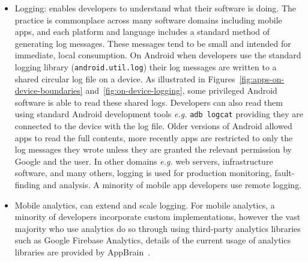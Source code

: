 \begin{itemize}
    \item Logging: enables developers to understand what their software is doing. The practice is commonplace across many software domains including mobile apps, and each platform and language includes a standard method of generating log messages. These messages tend to be small and intended for immediate, local consumption. On Android when developers use the standard logging library (\texttt{android.util.log}) their log messages are written to a shared circular log file on a device. As illustrated in Figures~\ref{fig:apps-on-device-boundaries} and~\ref{fig:on-device-logging}, some privileged Android software is able to read these shared logs. Developers can also read them using standard Android development tools \emph{e.g.} \texttt{adb logcat} providing they are connected to the device with the log file. Older versions of Android allowed apps to read the full contents, more recently apps are restricted to only the log messages they wrote unless they are granted the relevant permission by Google and the user. 
    In other domains \emph{e.g.} web servers, infrastructure software, and many others, logging is used for production monitoring, fault-finding and analysis. A minority of mobile app developers use remote logging.
    \item Mobile analytics, can extend and scale logging. For mobile analytics, a minority of developers incorporate custom implementations, however the vast majority who use analytics do so through using third-party analytics libraries such as Google Firebase Analytics, details of the current usage of analytics libraries are provided by AppBrain~.
\end{itemize}



